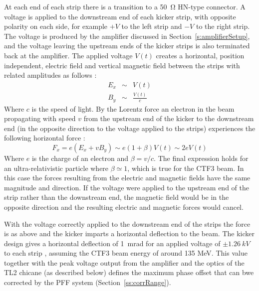 At each end of each strip there is a transition to a 50~\(\mathrm{\Omega}\) HN-type connector. A voltage is applied to the downstream end of each kicker strip, with opposite polarity on each side, for example \(+V\) to the left strip and \(-V\) to the right strip. The voltage is produced by the amplifier discussed in Section~\ref{s:amplifierSetup}, and the voltage leaving the upstream ends of the kicker strips is also terminated back at the amplifier. The applied voltage \(V(t)\) creates a horizontal, position independent, electric field and vertical magnetic field between the strips with related amplitudes as follows \cite{byrdKicker}:
\begin{eqnarray}
E_x &\sim& V(t) \\
B_y &\sim& \frac{V(t)}{c}
\end{eqnarray}
Where \(c\) is the speed of light. By the Lorentz force an electron in the beam propagating with speed \(v\) from the upstream end of the kicker to the downstream end (in the opposite direction to the voltage applied to the strips) experiences the following horizontal force \cite{byrdKicker}:
\begin{equation}
F_x = e(E_x + vB_y) \sim e(1+\beta)V(t) \sim 2eV(t)
\end{equation}
Where \(e\) is the charge of an electron and \(\beta = v/c\). The final expression holds for an ultra-relativistic particle where \(\beta \simeq 1\), which is true for the CTF3 beam. In this case the forces resulting from the electric and magnetic fields have the same magnitude and direction. If the voltage were applied to the upstream end of the strip rather than the downstream end, the magnetic field would be in the opposite direction and the resulting electric and magnetic forces would cancel. 

With the voltage correctly applied to the downstream end of the strips the force is as above and the kicker imparts a horizontal deflection to the beam. The kicker design gives a horizontal deflection of 1~mrad for an applied voltage of \(\pm1.26~kV\) to each strip \cite{kickerIPAC11}, assuming the CTF3 beam energy of around 135 MeV. This value together with the peak voltage output from the amplifier and the optics of the TL2 chicane (as described below) defines the maximum phase offset that can bwe corrected by the PFF system (Section~\ref{ss:corrRange}).

